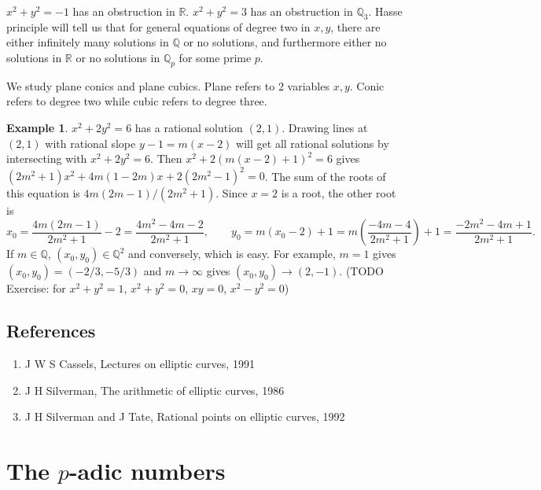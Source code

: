 \documentclass{article}
\newcommand{\Q}{\mathbb{Q}}
\newcommand{\R}{\mathbb{R}}
\newcommand{\rb}[1]{\left( #1 \right)}
\theoremstyle{definition}\newtheorem{definition}{Definition}[section]
\theoremstyle{definition}\newtheorem{remark}[definition]{Remark}
\theoremstyle{definition}\newtheorem*{example}{Example}
\theoremstyle{definition}\newtheorem*{note}{Note}
\begin{document}
$ x^2 + y^2 = -1 $ has an obstruction in $ \R $. $ x^2 + y^2 = 3 $ has an obstruction in $ \Q_3 $. Hasse principle will tell us that for general equations of degree two in $ x, y $, there are either infinitely many solutions in $ \Q $ or no solutions, and furthermore either no solutions in $ \R $ or no solutions in $ \Q_p $ for some prime $ p $.


We study plane conics and plane cubics. Plane refers to 2 variables $ x, y $. Conic refers to degree two while cubic refers to degree three.

\begin{example}
$ x^2 + 2y^2 = 6 $ has a rational solution $ \rb{2, 1} $. Drawing lines at $ \rb{2, 1} $ with rational slope $ y - 1 = m\rb{x - 2} $ will get all rational solutions by intersecting with $ x^2 + 2y^2 = 6 $. Then $ x^2 + 2\rb{m\rb{x - 2} + 1}^2 = 6 $ gives $ \rb{2m^2 + 1}x^2 + 4m\rb{1 - 2m}x + 2\rb{2m^2 - 1}^2 = 0 $. The sum of the roots of this equation is $ 4m\rb{2m - 1} / \rb{2m^2 + 1} $. Since $ x = 2 $ is a root, the other root is
$$ x_0 = \dfrac{4m\rb{2m - 1}}{2m^2 + 1} - 2 = \dfrac{4m^2 - 4m - 2}{2m^2 + 1}, \qquad y_0 = m\rb{x_0 - 2} + 1 = m\rb{\dfrac{-4m - 4}{2m^2 + 1}} + 1 = \dfrac{-2m^2 - 4m + 1}{2m^2 + 1}. $$
If $ m \in \Q $, $ \rb{x_0, y_0} \in \Q^2 $ and conversely, which is easy. For example, $ m = 1 $ gives $ \rb{x_0, y_0} = \rb{-2 / 3, -5 / 3} $ and $ m \to \infty $ gives $ \rb{x_0, y_0} \to \rb{2, -1} $. (TODO Exercise: for $ x^2 + y^2 = 1 $, $ x^2 + y^2 = 0 $, $ xy = 0 $, $ x^2 - y^2 = 0 $)
\end{example}

\subsection{References}

\begin{enumerate}
\item J W S Cassels, Lectures on elliptic curves, 1991
\item J H Silverman, The arithmetic of elliptic curves, 1986
\item J H Silverman and J Tate, Rational points on elliptic curves, 1992
\end{enumerate}

\pagebreak

\section{The $ p $-adic numbers}
\end{document}
